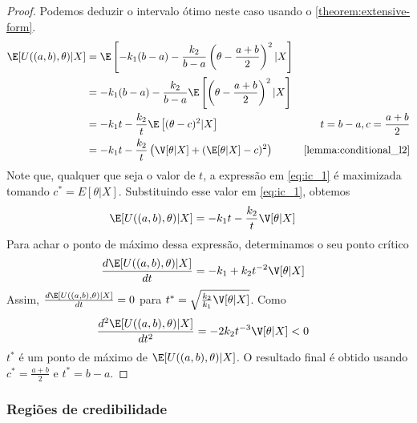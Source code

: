 \begin{proof}
Podemos deduzir o intervalo ótimo neste caso 
usando o \cref{theorem:extensive-form}.
\begin{align}
\label{eq:ic_1}
\E[U((a,b),\theta)|X]	
&= \E\left[-k_{1}(b-a)-\frac{k_{2}}{b-a}\left(\theta - \frac{a+b}{2}\right)^{2}|X\right]	\nonumber \\
&= -k_{1}(b-a) -\frac{k_{2}}{b-a}\E\left[\left(\theta - \frac{a+b}{2}\right)^{2}|X\right]	\nonumber \\
&= -k_{1}t -\frac{k_{2}}{t}\E\left[(\theta-c)^{2}|X\right]
& t=b-a, c=\frac{a+b}{2} \nonumber \\
&= -k_{1}t -\frac{k_{2}}{t}\left(\V[\theta|X]
+(\E[\theta|X]-c)^{2}\right)
& \text{\cref{lemma:conditional_l2}}
\end{align}
Note que, qualquer que seja o valor de $t$, 
a expressão em \cref{eq:ic_1} é maximizada 
tomando $c^{*}=E[\theta|X]$.
Substituindo esse valor em \cref{eq:ic_1}, obtemos
\begin{align*}
\E[U((a,b),\theta)|X]	
&= -k_{1}t -\frac{k_{2}}{t}\V[\theta|X]
\end{align*}
Para achar o ponto de máximo dessa expressão, 
determinamos o seu ponto crítico
\begin{align*}
\frac{d\E[U((a,b),\theta)|X]}{dt}	
&= -k_{1} +k_{2}t^{-2}\V[\theta|X]
\end{align*}
Assim, $\frac{d\E[U((a,b),\theta)|X]}{dt}=0$ para 
$t^{*} = \sqrt{\frac{k_2}{k_1}\V[\theta|X]}$.
Como
\begin{align*}
\frac{d^{2}\E[U((a,b),\theta)|X]}{dt^{2}} 
&= -2k_{2}t^{-3}\V[\theta|X] < 0
\end{align*}
$t^{*}$ é um ponto de máximo de 
$\E[U((a,b),\theta)|X]$.
O resultado final é obtido usando 
$c^{*}=\frac{a+b}{2}$ e $t^{*}=b-a$.
\end{proof}

\subsubsection{Regiões de credibilidade}

